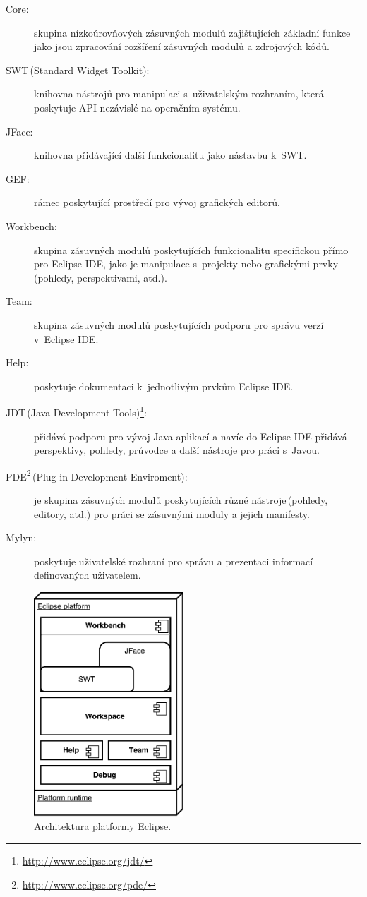   \begin{description}
    \item[Core:] skupina nízkoúrovňových zásuvných modulů zajišťujících základní funkce jako jsou zpracování rozšíření zásuvných modulů a zdrojových kódů.
    \item[SWT\,(Standard Widget Toolkit):] knihovna nástrojů pro manipulaci s~uživatelským rozhraním, která poskytuje API nezávislé na operačním systému.
    \item[JFace:] knihovna přidávající další funkcionalitu jako nástavbu k~SWT.
    \item[GEF:] rámec poskytující prostředí pro vývoj grafických editorů.
    \item[Workbench:] skupina zásuvných modulů poskytujících funkcionalitu specifickou přímo pro Eclipse IDE, jako je manipulace s~projekty nebo grafickými prvky (pohledy, perspektivami, atd.).
    \item[Team:] skupina zásuvných modulů poskytujících podporu pro správu verzí v~Eclipse IDE.
    \item[Help:] poskytuje dokumentaci k~jednotlivým prvkům Eclipse IDE.
    \item[JDT\,(Java Development Tools)\footnote{\url{http://www.eclipse.org/jdt/}}:] přidává podporu pro vývoj Java aplikací a navíc do Eclipse IDE přidává perspektivy, pohledy, průvodce a další nástroje pro práci s~Javou.
    \item[PDE\footnote{\url{http://www.eclipse.org/pde/}}\,(Plug-in Development Enviroment):] je skupina zásuvných modulů poskytujících různé nástroje\,(pohledy, editory, atd.) pro práci se zásuvnými moduly a jejich manifesty.
    \item[Mylyn:] poskytuje uživatelské rozhraní pro správu a prezentaci informací definovaných uživatelem.
  \end{description}

  \begin{figure}[h]
    \includegraphics[width=0.5\textwidth, center]{obrazky-figures/eclipse_arch.pdf}
    \caption{Architektura platformy Eclipse.}
    \label{fig:eclipse_arch}
  \end{figure}
  
